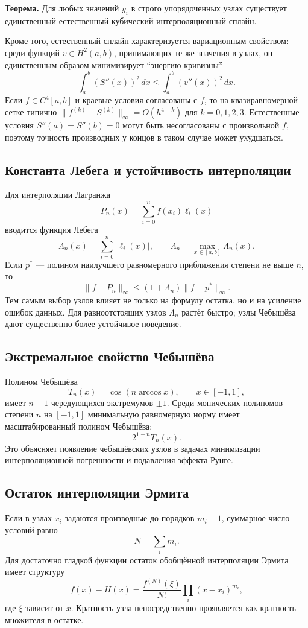 \textbf{Теорема.} Для любых значений $y_i$ в строго упорядоченных узлах существует единственный естественный кубический интерполяционный сплайн.

Кроме того, естественный сплайн характеризуется вариационным свойством: среди функций $v\in H^2(a,b)$, принимающих те же значения в узлах, он единственным образом минимизирует ``энергию кривизны''
\[
\boxed{
\int_a^b (S''(x))^2\,dx
\le
\int_a^b (v''(x))^2\,dx.
}
\]
Если $f\in C^4[a,b]$ и краевые условия согласованы с $f$, то на квазиравномерной сетке типично $\|f^{(k)}-S^{(k)}\|_\infty=O(h^{4-k})$ для $k=0,1,2,3$. Естественные условия $S''(a)=S''(b)=0$ могут быть несогласованы с произвольной $f$, поэтому точность производных у концов в таком случае может ухудшаться.


\subsection{Константа Лебега и устойчивость интерполяции}

Для интерполяции Лагранжа
\[
P_n(x)=\sum_{i=0}^{n}f(x_i)\ell_i(x)
\]
вводится функция Лебега
\[
\Lambda_n(x)=\sum_{i=0}^{n}|\ell_i(x)|,
\qquad
\Lambda_n=\max_{x\in[a,b]}\Lambda_n(x).
\]
Если $p^*$ --- полином наилучшего равномерного приближения степени не выше $n$,
то
\[
\|f-P_n\|_\infty
\le (1+\Lambda_n)\|f-p^*\|_\infty.
\]
Тем самым выбор узлов влияет не только на формулу остатка, но и на усиление
ошибок данных. Для равноотстоящих узлов $\Lambda_n$ растёт быстро; узлы Чебышёва
дают существенно более устойчивое поведение.

\subsection{Экстремальное свойство Чебышёва}

Полином Чебышёва
\[
T_n(x)=\cos(n\arccos x),\qquad x\in[-1,1],
\]
имеет $n+1$ чередующихся экстремумов $\pm1$. Среди монических полиномов степени
$n$ на $[-1,1]$ минимальную равномерную норму имеет масштабированный полином
Чебышёва:
\[
2^{1-n}T_n(x).
\]
Это объясняет появление чебышёвских узлов в задачах минимизации интерполяционной
погрешности и подавления эффекта Рунге.

\subsection{Остаток интерполяции Эрмита}

Если в узлах $x_i$ задаются производные до порядков $m_i-1$, суммарное число
условий равно
\[
N=\sum_i m_i.
\]
Для достаточно гладкой функции остаток обобщённой интерполяции Эрмита имеет
структуру
\[
f(x)-H(x)=\frac{f^{(N)}(\xi)}{N!}
\prod_i (x-x_i)^{m_i},
\]
где $\xi$ зависит от $x$. Кратность узла непосредственно проявляется как
кратность множителя в остатке.

